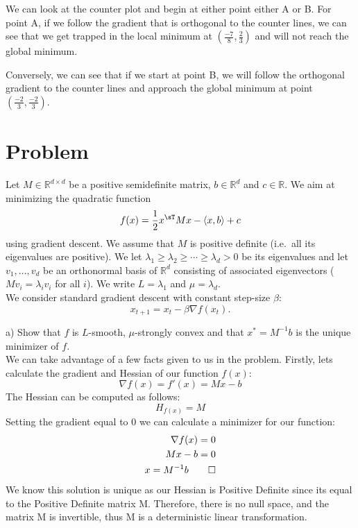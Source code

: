 \documentclass[12pt,twoside]{article}
\newcommand{\R}{\mathbb{R}}
\begin{document}
We can look at the counter plot and begin at either point either A or B. For point A, if we follow the gradient that is orthogonal to the counter lines, we can see that we get trapped in the local minimum at $(\frac{-7}{8},\frac{2}{3})$ and will not reach the global minimum.

Conversely, we can see that if we start at point B, we will follow the orthogonal gradient to the counter lines and approach the global minimum at point $(\frac{-2}{3},\frac{-2}{3})$. 

\vspace{5mm}

\section{Problem}
	Let $M \in \R^{d \times d}$ be a positive semidefinite matrix, $b \in \R^d$ and $c \in \R$. We aim at minimizing the quadratic function
	$$
	f(x) = \frac{1}{2} x^{\sT} M x - \langle x,b \rangle + c
	$$
	using gradient descent. 
	We assume that $M$ is positive definite (i.e.\ all its eigenvalues are positive).
	We let $\lambda_1 \geq \lambda_2 \geq \cdots \geq \lambda_d >0$ be its eigenvalues and let $v_1, \dots, v_d$ be an orthonormal basis of $\R^d$ consisting of associated eigenvectors ($Mv_i = \lambda_i v_i$ for all $i$).
	We write $L = \lambda_1$ and $\mu = \lambda_d$.
	\\

	We consider standard gradient descent with constant step-size $\beta$:
$$
x_{t+1} = x_t - \beta \nabla f(x_t).
$$

a) Show that $f$ is $L$-smooth, $\mu$-strongly convex and that $x^* = M^{-1} b$ is the unique minimizer of $f$.\\

We can take advantage of a few facts given to us in the problem. Firstly, lets calculate the gradient and Hessian of our function $f(x)$:
$$
    \nabla f(x) = f'(x) = Mx - b
$$
The Hessian can be computed as follows:
$$
    H_{f(x)}= M
$$
Setting the gradient equal to 0 we can calculate a minimizer for our function:
\begin{equation}
    \begin{split}
        \nabla f(x) = 0\\
        Mx - b = 0\\
        x = M^{-1}b \qed
    \end{split}
\end{equation}
We know this solution is unique as our Hessian is Positive Definite since its equal to the Positive Definite matrix M. Therefore, there is no null space, and the matrix M is invertible, thus M is a deterministic linear transformation. \\
\end{document}

